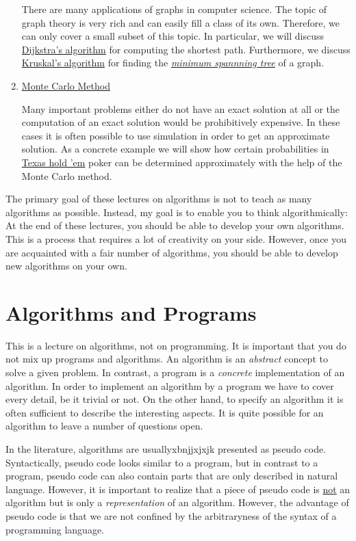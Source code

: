 \begin{enumerate}
      There are many applications of graphs in computer science.  The topic of graph theory is very
      rich and can easily fill a class of its own.  Therefore, we can only cover a small subset of this topic.
      In particular, we will discuss
      \href{http://en.wikipedia.org/wiki/Dijkstra%27s_algorithm}{Dijkstra's algorithm}
      for computing the shortest path.
      Furthermore, we discuss 
      \href{https://en.wikipedia.org/wiki/Kruskal%27s_algorithm}{Kruskal's algorithm} for finding the
      \href{https://en.wikipedia.org/wiki/Minimum_spanning_tree}{\emph{minimum spannning tree}} of a graph.
\item \href{http://en.wikipedia.org/wiki/Monte_Carlo_method}{Monte Carlo Method} 
 
      Many important problems either do not have an exact solution at all or the computation of an
      exact solution would be prohibitively expensive.  In these cases it is often possible to use 
      simulation in order to get an approximate solution.  As a concrete example we will show
      how certain probabilities in \href{http://en.wikipedia.org/wiki/Texas_hold_%27em}{Texas hold 'em} 
      poker can be determined approximately with the help of the Monte
      Carlo method.
\end{enumerate}
The primary goal of these lectures on algorithms is not to teach as many algorithms as possible.
Instead, my goal is to enable you to think algorithmically:  At the end of these
lectures, you should be able to develop your own algorithms.  This is a process that
requires a lot of creativity on your side.
However, once you are acquainted with a fair number of algorithms, you should be able to develop
new algorithms on your own.

\section{Algorithms and Programs}
This is a lecture on algorithms, not on programming.  It is important that you do not mix up
programs and algorithms.  An algorithm is an \emph{abstract} concept to solve a given problem.  In
contrast, a program is a \emph{concrete} implementation of an algorithm.  In order to implement an
algorithm by a program we have to cover every detail, be it trivial or not.  On the other hand, 
to specify an algorithm it is often sufficient to describe the interesting aspects.  It is
quite possible for an algorithm to leave a number of questions open.

In the literature, algorithms are usuallyxbnjjxjxjk presented as pseudo code.  Syntactically, pseudo code looks
similar to a program, but in contrast to a program, pseudo code can also contain parts that are only
described in natural language.   However, it is important to realize that a piece of pseudo code is
\underline{not} an algorithm but is only a \emph{ representation} of an algorithm.  However, the
advantage of pseudo code is that we are not confined by the arbitraryness of the syntax of a
programming language.

